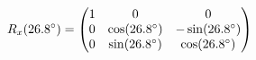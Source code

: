\documentclass[preview]{standalone}
\begin{document}
\begin{align*}
\special{dvisvgm:raw <g id='unique000'>}R_x(26.8^\circ) = \begin{pmatrix} 1 & 0 & 0 \\ 0 & \cos(26.8^\circ) & -\sin(26.8^\circ) \\ 0 & \sin(26.8^\circ) & \cos(26.8^\circ) \end{pmatrix}\special{dvisvgm:raw </g>}
\end{align*}
\end{document}
